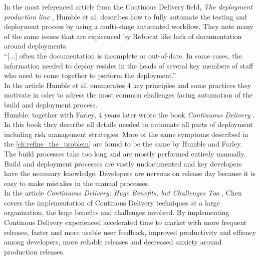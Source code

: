 \documentclass{ituthesis}
\begin{document}
In the most referenced article from the Continous Delivery field, \textit{The deployment production line} \cite{Humble2006}, Humble et al. describes how to fully automate the testing and deployment process by using a multi-stage automated workflow. They note many of the same issues that are expirenced by Robocat like lack of documentation around deployments.\\

``[...] often the documentation is incomplete or out-of-date. In some cases, the information needed to deploy resides in the heads of several key members of staff who need to come together to perform the deployment.'' \cite{Humble2006}\\

In the article Humble et al. enumerates 4 key principles and some practices they motivate in oder to adress the most common challenges facing automation of the build and deployment process.\\

Humble, together with Farley, 4 years later wrote the book \textit{Continuous Delivery} \cite{Humble2010}. In this book they describe all details needed to automate all parts of deployment including risk management strategies. More of the same symptoms described in the \autoref{ch:refine_the_problem} are found to be the same by Humble and Farley. The build processes take too long and are mostly performed entirely manually. Build and deployment processes are vastly undocumented and key developers have the necessary knowledge. Developers are nervous on release day because it is easy to make mistakes in the manual processes.\\

In the article \textit{Continuous Delivery: Huge Benefits, but Challenges Too} \cite{Chen2015}, Chen covers the implementation of Continous Delivery techniques at a large organization, the huge benefits and challenges involved. By implementing Continous Delivery \cite{Chen2015} experienced accelerated time to market with more frequent releases, faster and more usable user feedback, improved productivity and effiency among developers, more reliable releases and decreased anxiety around production releases.\\

\end{document}
